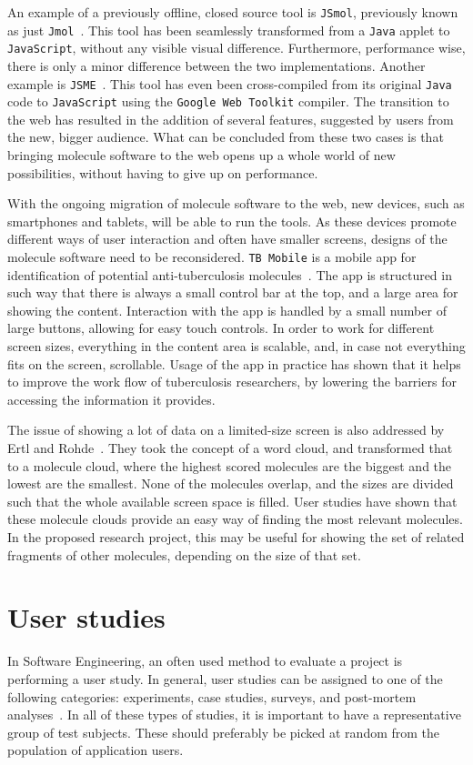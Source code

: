 An example of a previously offline, closed source tool is \verb|JSmol|, previously known as just \verb|Jmol|~\cite{hanson2013jsmol}. This tool has been seamlessly transformed from a \verb|Java| applet to \verb|JavaScript|, without any visible visual difference. Furthermore, performance wise, there is only a minor difference between the two implementations. Another example is \verb|JSME|~\cite{bienfait2013jsme}. This tool has even been cross-compiled from its original \verb|Java| code to \verb|JavaScript| using the \verb|Google Web Toolkit| compiler. The transition to the web has resulted in the addition of several features, suggested by users from the new, bigger audience. What can be concluded from these two cases is that bringing molecule software to the web opens up a whole world of new possibilities, without having to give up on performance.

With the ongoing migration of molecule software to the web, new devices, such as smartphones and tablets, will be able to run the tools. As these devices promote different ways of user interaction and often have smaller screens, designs of the molecule software need to be reconsidered. \verb|TB Mobile| is a mobile app for identification of potential anti-tuberculosis molecules~\cite{ekins2013tb}. The app is structured in such way that there is always a small control bar at the top, and a large area for showing the content. Interaction with the app is handled by a small number of large buttons, allowing for easy touch controls. In order to work for different screen sizes, everything in the content area is scalable, and, in case not everything fits on the screen, scrollable. Usage of the app in practice has shown that it helps to improve the work flow of tuberculosis researchers, by lowering the barriers for accessing the information it provides.

The issue of showing a lot of data on a limited-size screen is also addressed by Ertl and Rohde~\cite{ertl2012molecule}. They took the concept of a word cloud, and transformed that to a molecule cloud, where the highest scored molecules are the biggest and the lowest are the smallest. None of the molecules overlap, and the sizes are divided such that the whole available screen space is filled. User studies have shown that these molecule clouds provide an easy way of finding the most relevant molecules. In the proposed research project, this may be useful for showing the set of related fragments of other molecules, depending on the size of that set.


\section{User studies}
In Software Engineering, an often used method to evaluate a project is performing a user study. In general, user studies can be assigned to one of the following categories: experiments, case studies, surveys, and post-mortem analyses~\cite{wohlin2003empirical}. In all of these types of studies, it is important to have a representative group of test subjects. These should preferably be picked at random from the population of application users.

